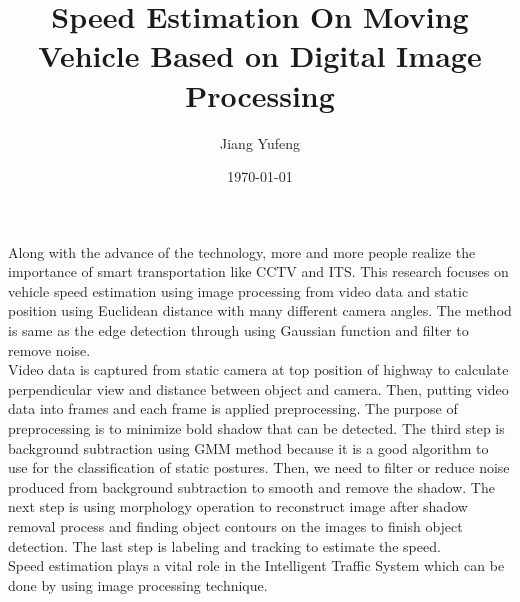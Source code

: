 \documentclass[11pt,oneside]{article}
\title{Speed Estimation On Moving Vehicle Based on Digital Image Processing}
\author{Jiang Yufeng}
\date{\today}
\begin{document}
\maketitle
Along with the advance of the technology, more and more people realize the importance of smart transportation like CCTV and ITS. This research focuses on vehicle speed estimation using image processing from video data and static position using Euclidean distance with many different camera angles. The method is same as the edge detection through using Gaussian function and filter to remove noise.  \\
\indent Video data is captured from static camera at top position of highway to calculate perpendicular view and distance between object and camera. Then, putting video data into frames and each frame is applied preprocessing. The purpose of preprocessing is to minimize bold shadow that can be detected. The third step is background subtraction using GMM method because it is a good algorithm to use for the classification of static postures. Then, we need to filter or reduce noise produced from background subtraction to smooth and remove the shadow. The next step is using morphology operation to reconstruct image after shadow removal process and finding object contours on the images to finish object detection. The last step is labeling and tracking to estimate the speed.\\
\indent Speed estimation plays a vital role in the Intelligent Traffic System which can be done by using image processing technique. 
\end{document}
